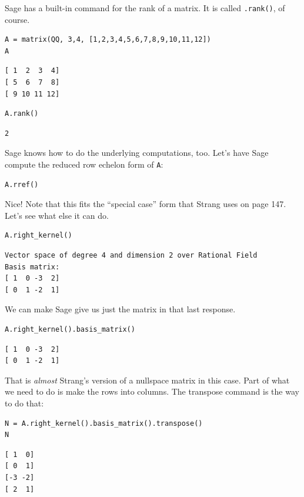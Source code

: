 \documentclass[10pt,]{book}
\theoremstyle{plain}
\theoremstyle{definition}
\numberwithin{equation}{section}
\begin{document}
      Sage has a built-in command for the rank of a matrix. It is called
      \verb?.rank()?, of course.
\begin{lstlisting}[style=sageinput]
A = matrix(QQ, 3,4, [1,2,3,4,5,6,7,8,9,10,11,12])
A
\end{lstlisting}
\begin{lstlisting}[style=sageoutput]
[ 1  2  3  4]
[ 5  6  7  8]
[ 9 10 11 12]
\end{lstlisting}
\begin{lstlisting}[style=sageinput]
A.rank()
\end{lstlisting}
\begin{lstlisting}[style=sageoutput]
2
\end{lstlisting}
\par

      Sage knows how to do the underlying computations, too. Let's have Sage
      compute the reduced row echelon form of \verb?A?:
\begin{lstlisting}[style=sageinput]
A.rref()
\end{lstlisting}
\par

      Nice! Note that this fits the ``special case'' form that Strang uses on
      page 147. Let's see what else it can do.
\begin{lstlisting}[style=sageinput]
A.right_kernel()
\end{lstlisting}
\begin{lstlisting}[style=sageoutput]
Vector space of degree 4 and dimension 2 over Rational Field
Basis matrix:
[ 1  0 -3  2]
[ 0  1 -2  1]
\end{lstlisting}
\par

      We can make Sage give us just the matrix in that last response.
\begin{lstlisting}[style=sageinput]
A.right_kernel().basis_matrix()
\end{lstlisting}
\begin{lstlisting}[style=sageoutput]
[ 1  0 -3  2]
[ 0  1 -2  1]
\end{lstlisting}
\par

      That is \emph{almost} Strang's version of a nullspace matrix in this case.
      Part of what we need to do is make the rows into columns. The transpose command is
      the way to do that:
\begin{lstlisting}[style=sageinput]
N = A.right_kernel().basis_matrix().transpose()
N
\end{lstlisting}
\begin{lstlisting}[style=sageoutput]
[ 1  0]
[ 0  1]
[-3 -2]
[ 2  1]
\end{lstlisting}
\par
\end{document}
